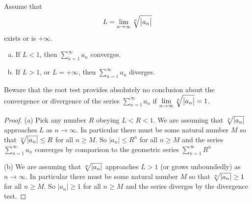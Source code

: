 \begin{theorem}\label{thm:SRroot}
Assume that
\begin{equation*}
L = \lim_{n\to\infty}\root{n}\of{\big|a_n\big|}
\end{equation*}
exists or is $+\infty$.
\begin{enumerate}[(a)]
\item If $L<1$, then $\sum\limits_{n=1}^\infty a_n$ converges.
\item If $L>1$, or $L=+\infty$,
then $\sum\limits_{n=1}^\infty a_n$ diverges.
\end{enumerate}
\end{theorem}

\begin{warning}
Beware that the root test provides absolutely no conclusion about the
convergence or divergence of the series $\sum\limits_{n=1}^\infty a_n$
if $\lim\limits_{n\rightarrow\infty}\root{n}\of{\big|a_n\big|} =  1$.
\end{warning}

\begin{proof}
(a) Pick any number $R$ obeying $L<R<1$. We are assuming that
$\root{n}\of{|a_n|}$ approaches $L$ as $n\rightarrow\infty$.
In particular there must be some natural number $M$ so that
$\root{n}\of{|a_n|}\le R$ for all $n\ge M$. So
$|a_n|\le R^n$ for all $n\ge M$ and the series
$\sum\limits_{n=1}^\infty a_n$ converges by comparison to the geometric
series $\sum\limits_{n=1}^\infty R^n$

\noindent (b) We are assuming that
$\root{n}\of{|a_n|}$ approaches $L>1$ (or grows unboundedly)
as $n\rightarrow\infty$. In particular there must be some natural
number $M$ so that $\root{n}\of{|a_n|}\ge 1$ for all $n\ge M$.
So $|a_n|\ge 1$ for all $n\ge M$ and the series diverges by the
divergence test.

\end{proof}

